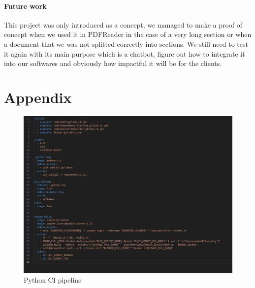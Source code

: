 \documentclass[a4paper,12pt,twoside]{report}
\begin{document}
\subsubsection{Future work}
This project was only introduced as a concept, we managed to make a proof of concept when we used it in PDFReader in the case of a very long section or when a document that we was not splitted correctly into sections. We still need to test it again with its main purpose which is a chatbot, figure out how to integrate it into our softwares and obviously how impactful it will be for the clients.





\appendix
\appendixpage
\addappheadtotoc
\chapter{Appendix}\label{appendix}
\begin{figure}[H]
		\includegraphics[width=\textwidth, keepaspectratio ]{images/python-yaml}
	\caption[pythonPipe]{Python CI pipeline}
\label{Python Pipeline}
\end{figure}	
\end{document}
